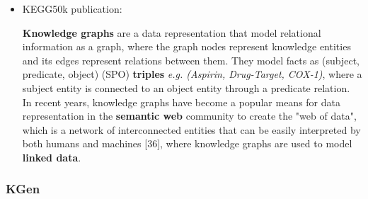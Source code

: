 \documentclass{article}
\begin{document}
\begin{itemize}

\item KEGG50k publication:
\begin{displayquote}
\textbf{Knowledge graphs} are a data representation that model relational information as a graph, where the graph nodes represent knowledge entities and its edges represent relations between them. They model facts as (subject, predicate, object) (SPO) \textbf{triples} \textit{e.g. (Aspirin, Drug-Target, COX-1)}, where a subject entity is connected to an object entity through a predicate relation.\\
In recent years, knowledge graphs have become a popular means for data representation in the \textbf{semantic web} community to create the "web of data", which is a network of interconnected entities that can be easily interpreted by both humans and machines [36], where knowledge graphs are used to model \textbf{linked data}.
\end{displayquote}

\end{itemize}


\subsubsection{KGen}
\end{document}
